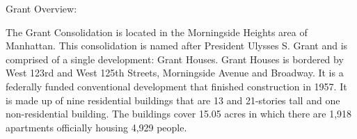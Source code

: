 Grant Overview:    

  

The Grant Consolidation is located in the Morningside Heights area of Manhattan. This consolidation is named after President Ulysses S. Grant and is comprised of a single development: Grant Houses. Grant Houses is bordered by West 123rd and West 125th Streets, Morningside Avenue and Broadway. It is a federally funded conventional development that finished construction in 1957. It is made up of nine residential buildings that are 13 and 21-stories tall and one non-residential building. The buildings cover 15.05 acres in which there are 1,918 apartments officially housing 4,929 people.   